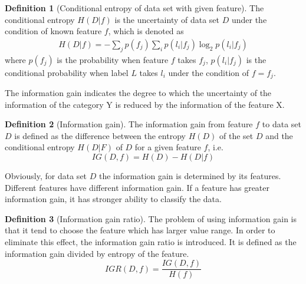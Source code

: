 \documentclass{ieeeaccess}
\theoremstyle{definition}
\newtheorem{defn}{Definition}
\begin{document}
\begin{defn}[Conditional entropy of data set with given feature]
The conditional entropy $H(D|f)$ is the uncertainty of data set $D$ under the condition of known feature $f$, which is denoted as
\begin{align}
    H(D|f)=-\sum_{j} p(f_j) \sum_{i} p(l_i|f_j) \log_2 p(l_i|f_j)
\end{align}
where $p(f_j)$ is the probability when feature $f$ takes $f_j$, $p(l_i|f_j)$ is the conditional probability when label $L$ takes $l_i$ under the condition of $f=f_j$.
\end{defn}

The information gain indicates the degree to which the uncertainty of the information of the category Y is reduced by the information of the feature X.

\begin{defn}[Information gain]
    The information gain from feature $f$ to data set $D$ is defined as the difference between the entropy $H(D)$ of the set $D$ and the conditional entropy $H(D|F)$ of $D$ for a given feature $f$, i.e.
\begin{equation}
    IG(D, f) = H(D) - H(D|f)
\end{equation}
\end{defn}

Obviously, for data set $D$ the information gain is determined by its features. Different features have different information gain. If a feature has greater information gain, it has stronger ability to classify the data.

\begin{defn}[Information gain ratio]
The problem of using information gain is that it tend to choose the feature which has larger value range. In order to eliminate this effect, the information gain ratio is introduced. It is defined as the information gain divided by entropy of the feature.
\begin{equation}
    IGR(D, f) = \frac{IG(D, f)}{H(f)}
\end{equation}
\end{defn}
\end{document}
